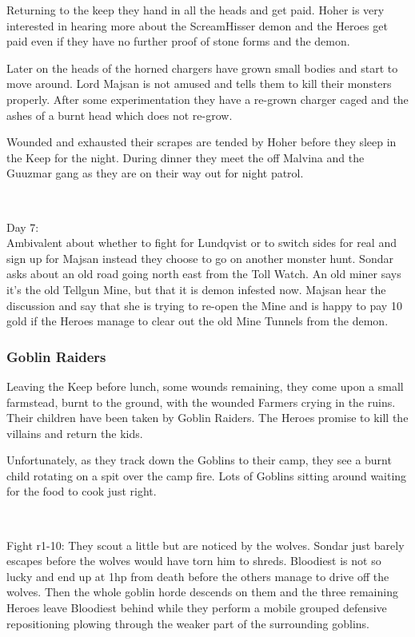 Returning to the keep they hand in all the heads and get paid. Hoher is very interested in hearing more about the ScreamHisser demon and the Heroes get paid even if they have no further proof of stone forms and the demon.

Later on the heads of the horned chargers have grown small bodies and start to move around. Lord Majsan is not amused and tells them to kill their monsters properly. After some experimentation they have a re-grown charger caged and the ashes of a burnt head which does not re-grow.

Wounded and exhausted their scrapes are tended by Hoher before they sleep in the Keep for the night. During dinner they meet the off Malvina and the Guuzmar gang as they are on their way out for night patrol.

\

Day 7:\\
Ambivalent about whether to fight for Lundqvist or to switch sides for real and sign up for Majsan instead they choose to go on another monster hunt. Sondar asks about an old road going north east from the Toll Watch. An old miner says it's the old Tellgun Mine, but that it is demon infested now. Majsan hear the discussion and say that she is trying to re-open the Mine and is happy to pay 10 gold if the Heroes manage to clear out the old Mine Tunnels from the demon.


\subsubsection*{Goblin Raiders}
Leaving the Keep before lunch, some wounds remaining, they come upon a small farmstead, burnt to the ground, with the wounded Farmers crying in the ruins. Their children have been taken by Goblin Raiders. The Heroes promise to kill the villains and return the kids.

Unfortunately, as they track down the Goblins to their camp, they see a burnt child rotating on a spit over the camp fire. Lots of Goblins sitting around waiting for the food to cook just right.

\

Fight r1-10: They scout a little but are noticed by the wolves. Sondar just barely escapes before the wolves would have torn him to shreds. Bloodiest is not so lucky and end up at 1hp from death before the others manage to drive off the wolves. Then the whole goblin horde descends on them and the three remaining Heroes leave Bloodiest behind while they perform a mobile grouped defensive repositioning plowing through the weaker part of the surrounding goblins.

